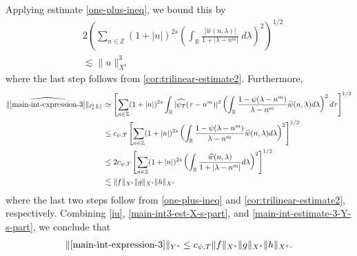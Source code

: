 \documentclass[12pt,reqno]{amsart}
\numberwithin{equation}{section}  %
\numberwithin{figure}{section}
\newcommand{\rr}{\mathbb{R}}
\newcommand{\zz}{\mathbb{Z}}
\newcommand{\wh}{\widehat}
\theoremstyle{plain}
\theoremstyle{definition}
\theoremstyle{remark}
\begin{document}
%
%
Applying estimate \eqref{one-plus-ineq}, we bound this by
%
\begin{equation}
	\label{main-int3-est-X-s-part}
	\begin{split}
		& 2 \left( \sum_{n \in \zz} \left (1 + |n| \right )^{2s}  \left ( \int_\rr
		\frac{|\wh{w}(n, \lambda)| }{1 + |\lambda - n^{m }|}
		 \ d\lambda \right )^2 \right)^{1/2}
		 \\
		& \lesssim \|u\|_{X^s}^3
	\end{split}
\end{equation}
%
where the last step follows from \autoref{cor:trilinear-estimate2}.
Furthermore, 
%
%
\begin{equation}
	\label{main-int-estimate-3-Y-s-part}
	\begin{split}
    \|\wh{\eqref{main-int-expression-3}}\|_{\ell^{2}_{n}L^{1}_{\tau}}
		& \simeq \left[ \sum_{n \in \zz} (1 + | n |)^{2s} \int_{\rr} |
    \wh{\psi_{T}}(\tau - n^{m}) |^{2} \left( \int_{\rr}\frac{1 - \psi(\lambda -
		n^{m})}{\lambda - n^{m}} \wh{w}(n, \lambda) d \lambda \right)^{2} d \tau
		\right]^{1/2}
		\\
		& \le c_{\psi, T} \left[ \sum_{n \in \zz} (1 + | n |)^{2s} \left(
		\int_{\rr} \frac{1 - \psi(\lambda - n^{m})}{\lambda - n^{m}}
		\wh{w}(n, \lambda) d \lambda
		\right)^{2}\right]^{1/2}
		\\
		& \le 2 c_{\psi, T} \left[ \sum_{n \in \zz} (1 + | n |)^{2s} \left(
		\int_{\rr} \frac{\wh{w}(n, \lambda) }{1 + |\lambda - n^{m}|}
		d \lambda
		\right)^{2}\right]^{1/2}
		\\
		& \lesssim \|f\|_{X^s} \|g\|_{X^s} \|h\|_{X^s}
	\end{split}
\end{equation}
%
%
where the last two steps follow from \eqref{one-plus-ineq} and
\autoref{cor:trilinear-estimate2}, respectively. Combining \eqref{iu},
\eqref{main-int3-est-X-s-part}, and \eqref{main-int-estimate-3-Y-s-part}, we
conclude that
%
%
\begin{equation}
	\label{main-int3-est}
	\begin{split}
		\|\eqref{main-int-expression-3}\|_{Y^s} 
    \le c_{\psi, T} \|f\|_{X^s} \|g\|_{X^s} \|h\|_{X^s}.
	\end{split}
\end{equation}
%
%
%
\end{document}
